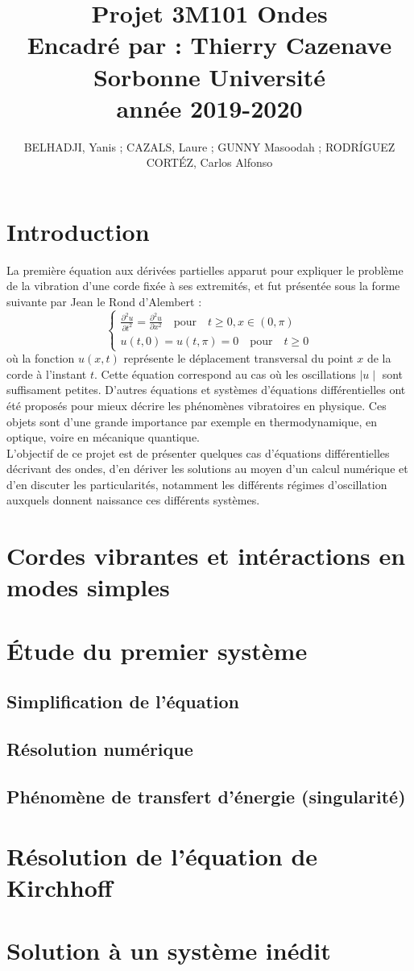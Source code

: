 \documentclass[10pt,a4paper]{article}
\author{BELHADJI, Yanis ; CAZALS, Laure ; GUNNY Masoodah ; RODRÍGUEZ CORTÉZ, Carlos Alfonso}
\title{%
Projet 3M101 Ondes\\ 
\large Encadré par : Thierry Cazenave\\
Sorbonne Université\\
\small année 2019-2020}
\begin{document}
\maketitle
\pagebreak
\tableofcontents
\pagebreak
\section{Introduction}
La première équation aux dérivées partielles apparut pour expliquer le problème de la vibration d'une corde fixée à ses extremités, et fut présentée sous la forme suivante par Jean le Rond d'Alembert :
\begin{equation} \label{Ondes} 
\begin{cases} 
\displaystyle \frac {\partial ^2 u } {\partial t ^2} = \frac {\partial ^2 u } {\partial x ^2}  \quad  \text{pour}\quad t\ge 0, x\in (0,\pi ) \\ u(t, 0)= u (t, \pi )= 0\quad  \text{pour} \quad t\ge 0
\end{cases} 
\end{equation} 
où la fonction $u(x, t)$ représente le déplacement transversal du point $x$ de la corde à l'instant $t$. Cette équation correspond au cas où les oscillations $\mid u\mid$ sont suffisament petites.
D'autres équations et systèmes d'équations différentielles ont été proposés pour mieux décrire les phénomènes vibratoires en physique. Ces objets sont d'une grande importance par exemple en thermodynamique, en optique, voire en mécanique quantique.\\
L'objectif de ce projet est de présenter quelques cas d'équations différentielles décrivant des ondes, d'en dériver les solutions au moyen d'un calcul numérique et d'en discuter les particularités, notamment les différents régimes d'oscillation auxquels donnent naissance ces différents systèmes.

\section{Cordes vibrantes et intéractions en modes simples}

\section{Étude du premier système}
\subsection{Simplification de l'équation}
\subsection{Résolution numérique}
\subsection{Phénomène de transfert d'énergie (singularité)}
\section{Résolution de l'équation de Kirchhoff}
\section{Solution à un système inédit}
\end{document}
